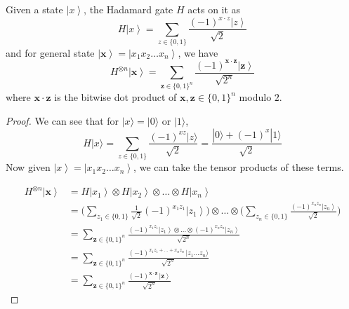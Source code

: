 \documentclass{article}
\newcommand{\ket}[1]{\ensuremath{\left|#1\right\rangle}}
\begin{document}
    \begin{lemma}
      Given a state $\ket{x}$, the Hadamard gate $H$ acts on it as 
      \begin{equation} 
        H \ket{x} = \sum_{z \in \{0, 1\}} \frac{(-1)^{x \cdot z} \ket{z}}{\sqrt{2}} 
      \end{equation}
      and for general state $\ket{\mathbf{x}} = \ket{x_1 x_2 \ldots x_n}$, we have 
      \begin{equation} 
        H^{\otimes n} \ket{\mathbf{x}} = \sum_{\mathbf{z} \in \{0, 1\}^n} \frac{(-1)^{\mathbf{x} \cdot \mathbf{z}} \ket{\mathbf{z}}}{\sqrt{2^n}}
      \end{equation}
      where $\mathbf{x} \cdot \mathbf{z}$ is the bitwise dot product of $\mathbf{x}, \mathbf{z} \in \{0, 1\}^n$ modulo $2$. 
    \end{lemma}
    \begin{proof} 
      We can see that for $|x\rangle = |0\rangle$ or $|1\rangle$, 
      \begin{equation} 
        H|x\rangle = \sum_{z \in \{0, 1\}} \frac{(-1)^{xz} |z\rangle}{\sqrt{2}} = \frac{|0\rangle + (-1)^x |1\rangle}{\sqrt{2}}
      \end{equation}
      Now given $\ket{x} = \ket{x_1 x_2 \ldots x_n}$, we can take the tensor products of these terms. 

      \begin{align*} 
        H^{\otimes n} \ket{\mathbf{x}} 
        & = H \ket{x_1} \otimes H \ket{x_2} \otimes \ldots \otimes H \ket{x_n} \\
        & = \bigg( \sum_{z_1 \in \{0, 1\}} \frac{1}{\sqrt{2}} (-1)^{x_1 z_1} \ket{z_1} \bigg) \otimes \ldots \otimes \bigg( \sum_{z_n \in \{0, 1\}} \frac{(-1)^{x_n z_n} \ket{z_n}}{\sqrt{2}} \bigg) \\
        & = \sum_{\mathbf{z} \in \{0, 1\}^n} \frac{(-1)^{x_1 z_1} \ket{z_1} \otimes \ldots \otimes (-1)^{x_n z_n} \ket{z_n}}{\sqrt{2^n}} \\
        & = \sum_{\mathbf{z} \in \{0, 1\}^n} \frac{(-1)^{x_1 z_1 + \ldots + x_n z_n} \, |z_1 \ldots z_n \rangle}{\sqrt{2^n}} \\
        & = \sum_{\mathbf{z} \in \{0, 1\}^n} \frac{(-1)^{\mathbf{x} \cdot \mathbf{z}} \, \ket{\mathbf{z}}}{\sqrt{2^n}}
      \end{align*}
    \end{proof}
\end{document}
